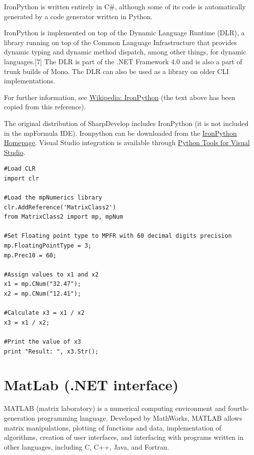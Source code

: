 IronPython is written entirely in C\#, although some of its code is automatically generated by a code generator written in Python.

IronPython is implemented on top of the Dynamic Language Runtime (DLR), a library running on top of the Common Language Infrastructure that provides dynamic typing and dynamic method dispatch, among other things, for dynamic languages.[7] The DLR is part of the .NET Framework 4.0 and is also a part of trunk builds of Mono. The DLR can also be used as a library on older CLI implementations.

For further information, see \href{http://en.wikipedia.org/wiki/IronPython}{Wikipedia: IronPython} (the text above has been copied from this reference).

The original distribution of SharpDevelop includes IronPython (it is not included in the mpFormula IDE). Ironpython can be downloaded from the 
\href{http://ironpython.net/}{IronPython Homepage}. Visual Studio integration is available through  \href{http://ironpython.net/tools/}{Python Tools for Visual Studio}.


\begin{lstlisting}
#Load CLR
import clr

#Load the mpNumerics library
clr.AddReference('MatrixClass2')
from MatrixClass2 import mp, mpNum

#Set Floating point type to MPFR with 60 decimal digits precision
mp.FloatingPointType = 3;
mp.Prec10 = 60;

#Assign values to x1 and x2
x1 = mp.CNum("32.47");
x2 = mp.CNum("12.41");

#Calculate x3 = x1 / x2
x3 = x1 / x2;

#Print the value of x3
print "Result: ", x3.Str();
\end{lstlisting}



	
	
	
	
	\newpage
	\section{MatLab (.NET interface)}
	\label{MatLabNET}
	
	MATLAB (matrix laboratory) is a numerical computing environment and fourth-generation programming language. Developed by MathWorks, MATLAB allows matrix manipulations, plotting of functions and data, implementation of algorithms, creation of user interfaces, and interfacing with programs written in other languages, including C, C++, Java, and Fortran.
	
